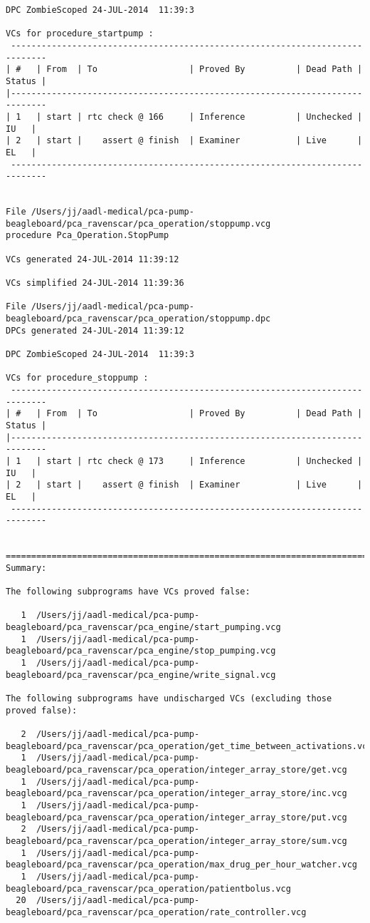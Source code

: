 \begin{lstlisting}[frame=single, gobble=0, caption={POGS report for PCA Pump prototype}]
DPC ZombieScoped 24-JUL-2014  11:39:3

VCs for procedure_startpump :
 -----------------------------------------------------------------------------
| #   | From  | To                  | Proved By          | Dead Path | Status |
|-----------------------------------------------------------------------------
| 1   | start | rtc check @ 166     | Inference          | Unchecked |   IU   |
| 2   | start |    assert @ finish  | Examiner           | Live      |   EL   |
 -----------------------------------------------------------------------------


File /Users/jj/aadl-medical/pca-pump-beagleboard/pca_ravenscar/pca_operation/stoppump.vcg
procedure Pca_Operation.StopPump

VCs generated 24-JUL-2014 11:39:12

VCs simplified 24-JUL-2014 11:39:36

File /Users/jj/aadl-medical/pca-pump-beagleboard/pca_ravenscar/pca_operation/stoppump.dpc
DPCs generated 24-JUL-2014 11:39:12

DPC ZombieScoped 24-JUL-2014  11:39:3

VCs for procedure_stoppump :
 -----------------------------------------------------------------------------
| #   | From  | To                  | Proved By          | Dead Path | Status |
|-----------------------------------------------------------------------------
| 1   | start | rtc check @ 173     | Inference          | Unchecked |   IU   |
| 2   | start |    assert @ finish  | Examiner           | Live      |   EL   |
 -----------------------------------------------------------------------------


===============================================================================
Summary:

The following subprograms have VCs proved false:

   1  /Users/jj/aadl-medical/pca-pump-beagleboard/pca_ravenscar/pca_engine/start_pumping.vcg
   1  /Users/jj/aadl-medical/pca-pump-beagleboard/pca_ravenscar/pca_engine/stop_pumping.vcg
   1  /Users/jj/aadl-medical/pca-pump-beagleboard/pca_ravenscar/pca_engine/write_signal.vcg

The following subprograms have undischarged VCs (excluding those proved false):

   2  /Users/jj/aadl-medical/pca-pump-beagleboard/pca_ravenscar/pca_operation/get_time_between_activations.vcg
   1  /Users/jj/aadl-medical/pca-pump-beagleboard/pca_ravenscar/pca_operation/integer_array_store/get.vcg
   1  /Users/jj/aadl-medical/pca-pump-beagleboard/pca_ravenscar/pca_operation/integer_array_store/inc.vcg
   1  /Users/jj/aadl-medical/pca-pump-beagleboard/pca_ravenscar/pca_operation/integer_array_store/put.vcg
   2  /Users/jj/aadl-medical/pca-pump-beagleboard/pca_ravenscar/pca_operation/integer_array_store/sum.vcg
   1  /Users/jj/aadl-medical/pca-pump-beagleboard/pca_ravenscar/pca_operation/max_drug_per_hour_watcher.vcg
   1  /Users/jj/aadl-medical/pca-pump-beagleboard/pca_ravenscar/pca_operation/patientbolus.vcg
  20  /Users/jj/aadl-medical/pca-pump-beagleboard/pca_ravenscar/pca_operation/rate_controller.vcg


\end{lstlisting}
